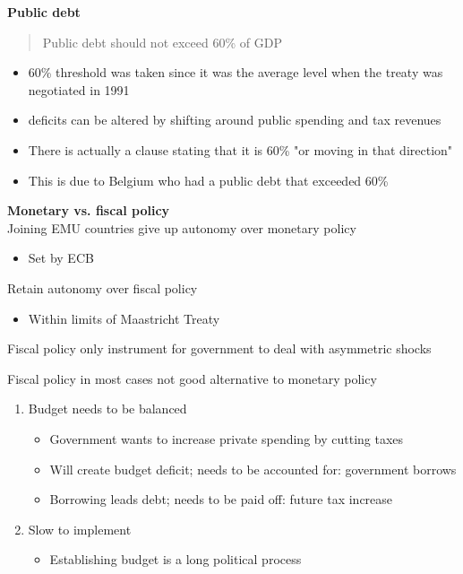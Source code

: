 \documentclass{beamer}
\begin{document}
\begin{frame}
  \textbf{Public debt} 
  \begin{quote}
    Public debt should not exceed 60\% of GDP
  \end{quote}
    \begin{itemize}
      \item 60\% threshold was taken since it was the average level when the treaty was negotiated in 1991
      \item deficits can be altered by shifting around public spending and tax revenues
      \item  There is actually a clause stating that it is 60\% "or moving in that direction"
      \item This is due to Belgium who had a public debt that exceeded 60\%
    \end{itemize}
\end{frame}


\begin{frame}
  \textbf{Monetary vs. fiscal policy}\\
  Joining EMU countries give up autonomy over monetary policy
  \begin{itemize}
    \item Set by ECB
  \end{itemize}
  \medskip
  Retain autonomy over fiscal policy
  \begin{itemize}
    \item Within limits of Maastricht Treaty
  \end{itemize}
  \medskip
  Fiscal policy only instrument for government to deal with asymmetric shocks
\end{frame}

\begin{frame}
  Fiscal policy in most cases not good alternative to monetary policy
\begin{enumerate}
  \item Budget needs to be balanced
  \begin{itemize}
    \item Government wants to increase private spending by cutting taxes
    \item Will create budget deficit; needs to be accounted for: government borrows
    \item Borrowing leads debt; needs to be paid off: future tax increase
  \end{itemize}
  \item Slow to implement
  \begin{itemize}
    \item Establishing budget is a long political process
  \end{itemize}
\end{enumerate}
\end{frame}
\end{document}
